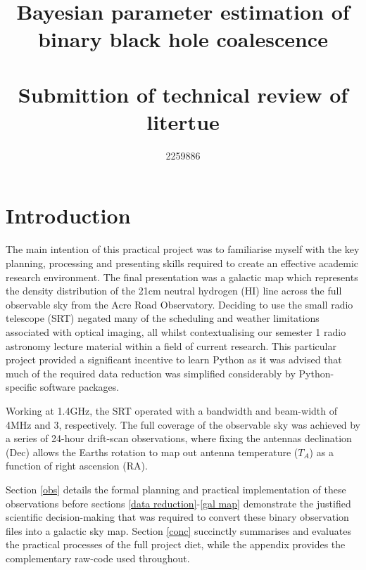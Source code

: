 \documentclass[11pt]{article} %
\title{\bf{Bayesian parameter estimation of binary black hole coalescence}\\~\\
\large Submittion of technical review of litertue}
\author{2259886}
\begin{document}
\maketitle






\section{Introduction} \label{intro}

The main intention of this practical project was to familiarise myself with the key planning, processing and presenting skills required to create an effective academic research environment. The final presentation was a galactic map which represents the density distribution of the 21cm neutral hydrogen (HI) line across the full observable sky from the Acre Road Observatory. Deciding to use the small radio telescope (SRT) negated many of the scheduling and weather limitations associated with optical imaging, all whilst contextualising our semester 1 radio astronomy lecture material within a field of current research. This particular project provided a significant incentive to learn Python as it was advised that much of the required data reduction was simplified considerably by Python-specific software packages.

Working at 1.4GHz, the SRT operated with a bandwidth and beam-width of 4MHz and 3\degree, respectively. The full coverage of the observable sky was achieved by a series of 24-hour drift-scan observations, where fixing the antenna\textquotesingle s declination (Dec) allows the Earth\textquotesingle s rotation to map out antenna temperature ($T_{A}$) as a function of right ascension (RA).
 
Section \ref{obs} details the formal planning and practical implementation of these observations before sections \ref{data reduction}-\ref{gal map} demonstrate the justified scientific decision-making that was required to convert these binary observation files into a galactic sky map. Section \ref{conc} succinctly summarises and evaluates the practical processes of the full project diet, while the appendix provides the complementary raw-code used throughout.
\end{document}
